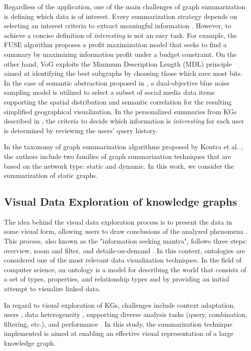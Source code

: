\documentclass{ieeeaccess}
\begin{document}
Regardless of the application, one of the main challenges of graph summarization is defining
which data is of interest. Every summarization strategy depends on selecting an interest
criteria to extract meaningful information \cite{liu2018graph}. However, to achieve a concise
definition of \textit{interesting} is not an easy task. For example, the FUSE algorithm \cite {Seah12} 
proposes a profit maximization model that seeks to find a summary by maximizing information
profit under a budget constraint. On the other hand, VoG \cite{koutra2014vog} exploits
the Minimum Description Length (MDL) principle aimed at identifying the best subgraphs
by choosing those which save most bits. In the case of semantic abstraction proposed in
\cite{8801911}, a dual-objective blue noise sampling model is utilized to select a subset
of social media data items supporting the spatial distribution and semantic correlation for
the resulting simplified geographical visualization. In the personalized summaries from
KGs described in \cite{Koutra2019}, the criteria to decide which information is \textit{interesting}
for each user is determined by reviewing the users' query history.

In the taxonomy of graph summarization algorithms
proposed by Koutra et al. \cite{liu2018graph}, the authors include
two families of graph summarization techniques that are based on the 
network type: static and dynamic. In this work, we consider the summarization
of static graphs.


\subsection{Visual Data Exploration of knowledge graphs}
The idea behind the visual data exploration process is to present the data
in some visual form, allowing users to draw conclusions of the analyzed
phenomena \cite{keim2001visual}. This process, also known as the "information
seeking mantra", follows three steps: overview, zoom and filter, and 
details-on-demand \cite{Shneiderman96}. In this context, ontologies are considered
one of the most relevant data visualization techniques. In the field of 
computer science, an ontology is a model for describing the world that consists
of a set of types, properties, and relationship types \cite{Garshol2004MetadataTT}
and by providing an initial attempt to visualize linked data.

In regard to visual exploration of KGs, challenges include context adaptation,
users \cite{Koutra2019}, data heterogeneity \cite{OntoVis,6787141,1703364}, 
supporting diverse analysis tasks (query, combination, filtering, etc.), 
and performance \cite{gomez2018visualizing}. In this study, the summarization
technique implemented is aimed at enabling an effective visual representation
of a large knowledge graph.
\end{document}
